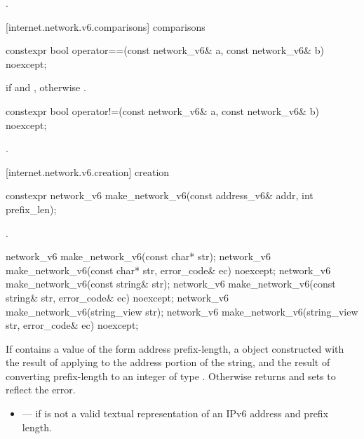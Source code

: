 \begin{itemdescr}
\pnum
\returns {}.
\end{itemdescr}



[internet.network.v6.comparisons]{ comparisons}

\begin{itemdecl}
constexpr bool operator==(const network_v6& a, const network_v6& b) noexcept;
\end{itemdecl}

\begin{itemdescr}
\pnum
\returns {} if  and , otherwise .
\end{itemdescr}

\begin{itemdecl}
constexpr bool operator!=(const network_v6& a, const network_v6& b) noexcept;
\end{itemdecl}

\begin{itemdescr}
\pnum
\returns {}.
\end{itemdescr}



[internet.network.v6.creation]{ creation}

\begin{itemdecl}
constexpr network_v6 make_network_v6(const address_v6& addr, int prefix_len);
\end{itemdecl}

\begin{itemdescr}
\pnum
\returns {}.
\end{itemdescr}

\begin{itemdecl}
network_v6 make_network_v6(const char* str);
network_v6 make_network_v6(const char* str, error_code& ec) noexcept;
network_v6 make_network_v6(const string& str);
network_v6 make_network_v6(const string& str, error_code& ec) noexcept;
network_v6 make_network_v6(string_view str);
network_v6 make_network_v6(string_view str, error_code& ec) noexcept;
\end{itemdecl}

\begin{itemdescr}
\pnum
\returns If  contains a value of the form address  prefix-length, a  object constructed with the result of applying  to the address portion of the string, and the result of converting prefix-length to an integer of type . Otherwise returns  and sets  to reflect the error.

\pnum
\errors
\begin{itemize}
\item
{} --- if  is not a valid textual representation of an IPv6 address and prefix length.
\end{itemize}
\end{itemdescr}



